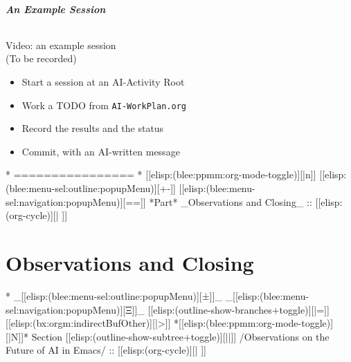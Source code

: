 \begin{whenOrg}
\begin{verblatex}
\begin{frame}[fragile,plain,label=exampleSession]
    \frametitle{An Example Session}
    \framesubtitle{}

\begin{center}
    {\Large Video: an example session}\\
    \vspace{0.2in}
    (To be recorded)
  \end{center}

  \begin{itemize}
  \item Start a session at an AI-Activity Root
  \item Work a TODO from \texttt{AI-WorkPlan.org}
  \item Record the results and the status
  \item Commit, with an AI-written message
  \end{itemize}


\end{frame}
\end{verblatex}



\begin{whenOrg}
*      ================
*  [[elisp:(blee:ppmm:org-mode-toggle)][|n]] [[elisp:(blee:menu-sel:outline:popupMenu)][+-]] [[elisp:(blee:menu-sel:navigation:popupMenu)][==]]  *Part*   _Observations and Closing_ ::  [[elisp:(org-cycle)][| ]]
\end{whenOrg}

\newpage
\part{Observations and Closing}

\begin{whenOrg}
*  _[[elisp:(blee:menu-sel:outline:popupMenu)][±]]_ _[[elisp:(blee:menu-sel:navigation:popupMenu)][Ξ]]_ [[elisp:(outline-show-branches+toggle)][|=]] [[elisp:(bx:orgm:indirectBufOther)][|>]] *[[elisp:(blee:ppmm:org-mode-toggle)][|N]]*  Section    [[elisp:(outline-show-subtree+toggle)][||]]   /Observations on the Future of AI in Emacs/ ::  [[elisp:(org-cycle)][| ]]
\end{whenOrg}


\end{whenOrg}
